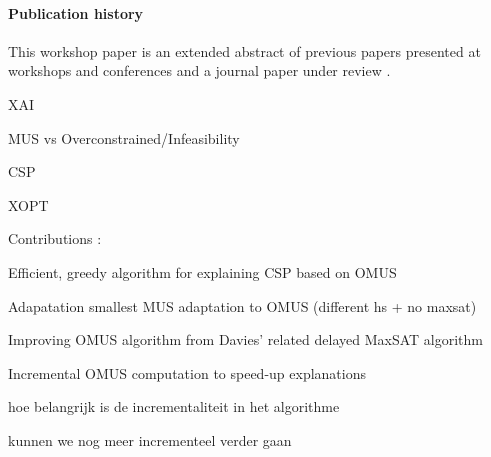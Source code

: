 {{\paragraph*{Publication history} This workshop paper is an extended abstract of previous papers presented at workshops and conferences \cite{claesuser,DBLP:conf/bnaic/ClaesBCGG19,ecai/BogaertsGCG20} and a journal paper under review \cite{bogaerts2020framework}.
}

\begin{compactenum}
    \item XAI
    \item MUS vs Overconstrained/Infeasibility
    \item CSP
    \item XOPT
\end{compactenum}

Contributions : 
\begin{compactenum}
    \item Efficient, greedy algorithm for explaining CSP based on OMUS 
    \item Adapatation smallest MUS adaptation to OMUS (different hs + no maxsat) 
    \item Improving OMUS algorithm from Davies' related delayed MaxSAT algorithm 
    \item Incremental OMUS computation to speed-up explanations
    \begin{compactitem}
        \item hoe belangrijk is de incrementaliteit in het algorithme
        \item kunnen  we nog meer incrementeel verder gaan
    \end{compactitem}
\end{compactenum}
}


